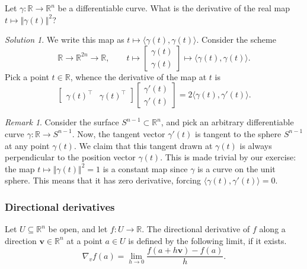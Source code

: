 \documentclass[11pt]{article}
\newcommand{\R}{\mathbb{R}}
\newcommand{\ip}[2]{\langle #1, #2 \rangle}
\newcommand{\norm}[1]{\Vert #1 \Vert}
\renewcommand{\vec}[1]{\boldsymbol{#1}}
\newcommand{\vv}{\vec{v}}
\newcommand{\grad}{\nabla}
\theoremstyle{definition}
\theoremstyle{remark}
\newtheorem*{remark}{Remark}
\newtheorem*{solution}{Solution}
\numberwithin{equation}{section}
\begin{document}
    \begin{exercise}
        Let $\gamma\colon \R \to \R^n$ be a differentiable curve. What is the
        derivative of the real map $t \mapsto \norm{\gamma(t)}^2$?
        \begin{solution}
            We write this map as $t \mapsto \ip{\gamma(t)}{\gamma(t)}$. Consider the
            scheme \[
                \R \to \R^{2n} \to \R, \qquad
                t \mapsto \begin{bmatrix}
                    \gamma(t) \\ \gamma(t)
                \end{bmatrix} \mapsto \ip{\gamma(t)}{\gamma(t)}.
            \] Pick a point $t\in \R$, whence the derivative of the map at $t$ is \[
                \begin{bmatrix}
                    \gamma(t)^\top & \gamma(t)^\top
                \end{bmatrix} \begin{bmatrix}
                    \gamma'(t) \\ \gamma'(t)
                \end{bmatrix} = 2\ip{\gamma(t)}{\gamma'(t)}.
            \] 
        \end{solution}
        \begin{remark}
            Consider the surface $S^{n - 1} \subset \R^n$, and pick an arbitrary
            differentiable curve $\gamma\colon \R \to S^{n - 1}$. Now, the tangent
            vector $\gamma'(t)$ is tangent to the sphere $S^{n - 1}$ at any point
            $\gamma(t)$. We claim that this tangent drawn at $\gamma(t)$ is always
            perpendicular to the position vector $\gamma(t)$. This is made trivial by
            our exercise: the map $t \mapsto \norm{\gamma(t)}^2 = 1$ is a constant
            map since $\gamma$ is a curve on the unit sphere. This means that it has
            zero derivative, forcing $\ip{\gamma(t)}{\gamma'(t)} = 0$.
        \end{remark}
    \end{exercise}

    \subsubsection{Directional derivatives}

    \begin{definition}
        Let $U \subseteq \R^n$ be open, and let $f\colon U \to \R$. The directional
        derivative of $f$ along a direction $\vv \in \R^n$ at a point $a \in U$ is
        defined by the following limit, if it exists. \[
            \grad_v f(a) = \lim_{h \to 0} \frac{f(a + h\vv) - f(a)}{h}.
        \] 
    \end{definition}
\end{document}
